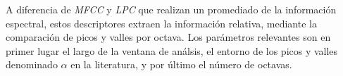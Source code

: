 \documentclass{article}
\begin{document}
A diferencia de \textit{MFCC} y \textit{LPC} que realizan un promediado de la información espectral, estos descriptores extraen la información relativa, mediante la comparación de picos y valles por octava. Los parámetros relevantes son en primer lugar el largo de la ventana de análsis, el entorno de los picos y valles denominado $\alpha$ en la literatura, y por último el número de octavas. 

%
%
%
%
%
%
%
%
\end{document}
